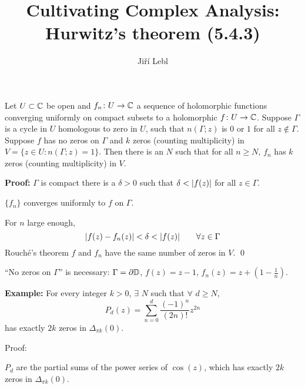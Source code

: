 \documentclass[10pt,aspectratio=169]{beamer}
\author{Ji\v{r}\'i Lebl}
\institute[OSU]{%
Departemento pri Matematiko de Oklahoma {\^S}tata Universitato}
\title{Cultivating Complex Analysis:\\%
Hurwitz's theorem (5.4.3)}
\date{}
\begin{document}
\begin{frame}
\titlepage
\end{frame}

\begin{frame}
\begin{theorem}[Hurwitz]
Let $U \subset {\mathbb{C}}$ be open and $f_n \colon U \to {\mathbb{C}}$ a sequence of
holomorphic functions converging uniformly on compact subsets
to a holomorphic $f \colon U \to {\mathbb{C}}$.  Suppose $\Gamma$ is
a cycle in $U$ homologous to zero in $U$,
such that $n(\Gamma;z)$ is $0$ or $1$ for all $z \notin \Gamma$.
Suppose $f$ has no zeros on $\Gamma$ and $k$ zeros (counting
multiplicity) in $V = \{ z \in U : n(\Gamma;z) = 1 \}$.
Then there is an $N$ such that for all $n \geq N$,
$f_n$ has $k$ zeros (counting multiplicity) in $V$.
\end{theorem}

\medskip
\pause

\textbf{Proof:}
$\Gamma$ is compact \wthus
there is a $\delta > 0$ such that $\delta < \lvert {f(z)} \rvert$
for all $z \in \Gamma$.

\medskip
\pause

$\{ f_n \}$
converges uniformly to $f$ on $\Gamma$.

\medskip
\pause

For $n$ large enough,
\begin{equation*}
\lvert {f(z)-f_n(z)} \rvert < \delta < \lvert {f(z)} \rvert
\qquad \forall z \in \Gamma
\end{equation*}
\pause
Rouch\'e's theorem
\wthus
$f$ and $f_n$ have the same number of zeros in $V$.  \qed

\medskip
\pause

``No zeros on $\Gamma$'' is necessary:
\quad $\Gamma = \partial {\mathbb{D}}$,
\quad $f(z) = z-1$, \quad $f_n(z) = z+(1-\frac{1}{n})$.
\end{frame}

\begin{frame}
\textbf{Example:}
For every integer $k > 0$, $\exists$ $N$ such that
$\forall$ $d \geq N$,
\begin{equation*}
P_d(z) = \sum_{n=0}^d \frac{{(-1)}^n}{(2n)!}z^{2n}
\end{equation*}
has exactly $2k$ zeros in $\Delta_{\pi k}(0)$.

\medskip
\pause

Proof:

$P_d$ are the partial sums of the power series of
$\cos(z)$, which has exactly $2k$ zeros in $\Delta_{\pi k}(0)$.
\end{frame}
\end{document}
